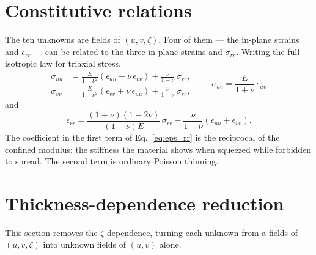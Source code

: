 \documentclass[11pt]{article}
\begin{document}
\section{Constitutive relations}\label{sec:hooke3d}
The ten unknowns are fields of $(u,v,\zeta)$. Four of them --- the in-plane strains and $\epsilon_{rr}$ --- can be related to the three in-plane strains and $\sigma_{rr}$. Writing the full isotropic law for triaxial stress,
\begin{equation}\label{eq:hooke3d}
    \boxed{\;
    \begin{aligned}
    \sigma_{uu} &= \frac{E}{1-\nu^{2}}
      \left(\epsilon_{uu} + \nu\,\epsilon_{vv}\right)
      + \frac{\nu}{1-\nu}\,\sigma_{rr},\\
    \sigma_{vv} &= \frac{E}{1-\nu^{2}}
      \left(\epsilon_{vv} + \nu\,\epsilon_{uu}\right)
      + \frac{\nu}{1-\nu}\,\sigma_{rr},
    \end{aligned}
    \qquad
    \sigma_{uv} = \frac{E}{1+\nu}\,\epsilon_{uv},\;}
\end{equation}
and
\begin{equation}\label{eq:eps_rr}
    \boxed{\;\epsilon_{rr} =
      \frac{\left(1+\nu\right)\left(1-2\nu\right)}{\left(1-\nu\right)E}\,
      \sigma_{rr}
      - \frac{\nu}{1-\nu}\left(\epsilon_{uu} + \epsilon_{vv}\right).\;}
\end{equation}
The coefficient in the first term of Eq.~\eqref{eq:eps_rr} is the reciprocal of
the confined modulus: the stiffness the material shows when squeezed while
forbidden to spread. The second term is ordinary Poisson thinning.

\section{Thickness-dependence reduction}\label{sec:thickness}
This section removes the $\zeta$
dependence, turning each unknown from a fields of $(u,v,\zeta)$ into unknown fields of $(u,v)$ alone.
\end{document}
